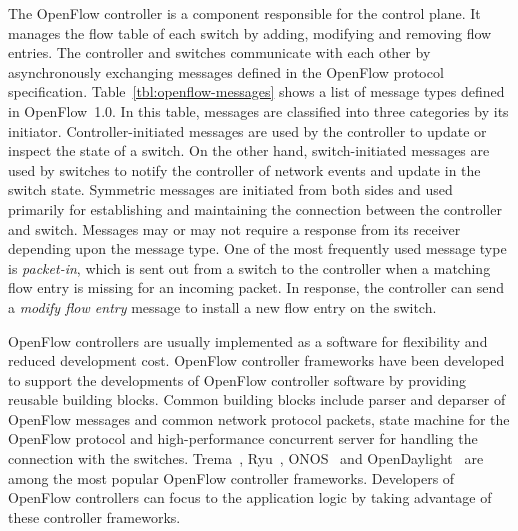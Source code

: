The OpenFlow controller is a component responsible for the control plane. It
manages the flow table of each switch by adding, modifying and removing flow
entries. The controller and switches communicate with each other by
asynchronously exchanging messages defined in the OpenFlow protocol
specification. Table~\ref{tbl:openflow-messages} shows a list of message types
defined in OpenFlow~1.0. In this table, messages are classified into three
categories by its initiator. Controller-initiated messages are used by the
controller to update or inspect the state of a switch. On the other hand,
switch-initiated messages are used by switches to notify the controller of
network events and update in the switch state. Symmetric messages are
initiated from both sides and used primarily for establishing and maintaining
the connection between the controller and switch. Messages may or may not
require a response from its receiver depending upon the message type. One of
the most frequently used message type is \emph{packet-in}, which is sent out
from a switch to the controller when a matching flow entry is missing for an
incoming packet. In response, the controller can send a \emph{modify flow
entry} message to install a new flow entry on the switch.

OpenFlow controllers are usually implemented as a software for flexibility and
reduced development cost. OpenFlow controller frameworks have been developed
to support the developments of OpenFlow controller software by providing
reusable building blocks. Common building blocks include parser and deparser
of OpenFlow messages and common network protocol packets, state machine for
the OpenFlow protocol and high-performance concurrent server for handling the
connection with the switches. Trema~\autocite{trema}, Ryu~\autocite{Ryu2014},
ONOS~\autocite{Berde2014} and OpenDaylight~\autocite{Medved2014} are among the
most popular OpenFlow controller frameworks. Developers of OpenFlow
controllers can focus to the application logic by taking advantage of these
controller frameworks.

